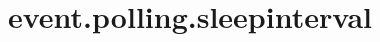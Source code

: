 \section{event.polling.sleepinterval}
\label{configuration:EventPollingSleepinterval}
\AvailableInJavaAndCsharp{\TODO}